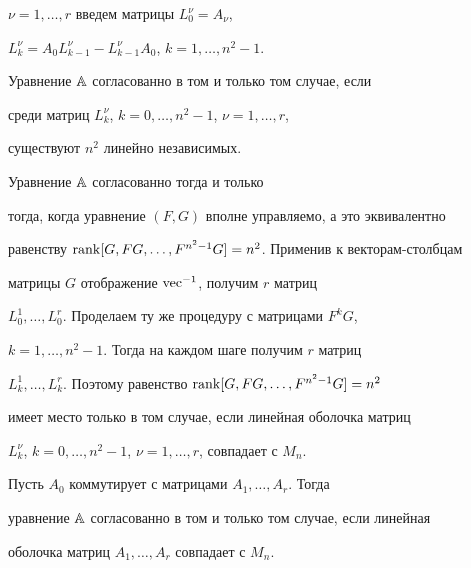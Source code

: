 $\nu=1,\dotsc,r$ введем матрицы $L_0^{\nu}=A_{\nu}$,


$L_k^{\nu}=A_0L_{k-1}^{\nu}-L_{k-1}^{\nu}A_0$, $k=1,\dotsc,n^2-1$.





\begin{thm}


\label{th5.2}


Уравнение $\Bbb A$ согласованно в том и только том случае, если


среди матриц $L_k^{\nu}$, $k=0,\dotsc,n^2-1$, $\nu=1,\dotsc,r$,


существуют $n^2$ линейно независимых.


\end{thm}





\begin{pf} Уравнение $\Bbb A$ согласованно тогда и только


тогда, когда уравнение $(F,G)$ вполне управляемо, а это эквивалентно


равенству $\operatorname{rank}[G,FG,\dotsc,F^{n^2-1}G]=n^2$. Применив к векторам-столбцам


матрицы $G$ отображение $\operatorname{vec}^{-1}$, получим $r$ матриц


$L_0^1,\dotsc,L_0^r$. Проделаем ту же процедуру с матрицами $F^kG$,


$k=1,\dotsc,n^2-1$. Тогда на каждом шаге получим $r$ матриц


$L_k^1,\dotsc,L_k^r$. Поэтому равенство $\operatorname{rank}[G,FG,\dotsc,F^{n^2-1}G]=n^2$


имеет место только в том случае, если линейная оболочка матриц


$L_k^{\nu}$, $k=0,\dotsc,n^2-1$, $\nu=1,\dotsc,r$, совпадает с $M_n$.


\end{pf}





\begin{cor}


\label{cor1}


Пусть $A_0$ коммутирует с матрицами $A_1,\dotsc,A_r$. Тогда


уравнение $\Bbb A$ согласованно в том и только том случае, если линейная


оболочка матриц $A_1,\dotsc,A_r$ совпадает с $M_n$.


\end{cor}





